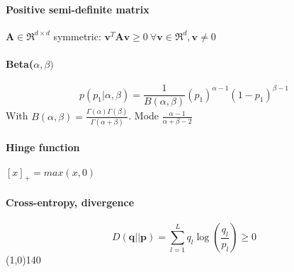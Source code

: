 \documentclass[7pt]{scrartcl}
\renewcommand{\vec}{\mathbf}
\begin{document}
\begin{multicols}{4}
\paragraph{Positive semi-definite matrix} $\vec A \in \Re^ {d\times d}$ symmetric:
$\vec v^T \vec A \vec v \geq 0 ~ \forall \vec v \in \Re^d, \vec v\neq 0$
\paragraph{Beta($\alpha,\beta)$}
\[p(p_1|\alpha,\beta) = \frac{1}{B(\alpha,\beta)}(p_1)^{\alpha-1}(1-p_1)^{\beta -1}\]
With $B(\alpha,\beta) = \frac{\Gamma(\alpha)\Gamma(\beta)}{\Gamma(\alpha + \beta)}$.
Mode $\frac{\alpha - 1}{\alpha + \beta - 2}$
\paragraph{Hinge function}
$[x]_+ = max(x,0)$
\paragraph{Cross-entropy, divergence}
\[D(\vec{q}||\vec{p}) = \sum_{l=1}^L q_l \log(\frac{q_l}{p_l}) \geq 0\]
\line(1,0){140} \\
\end{multicols}
\end{document}
